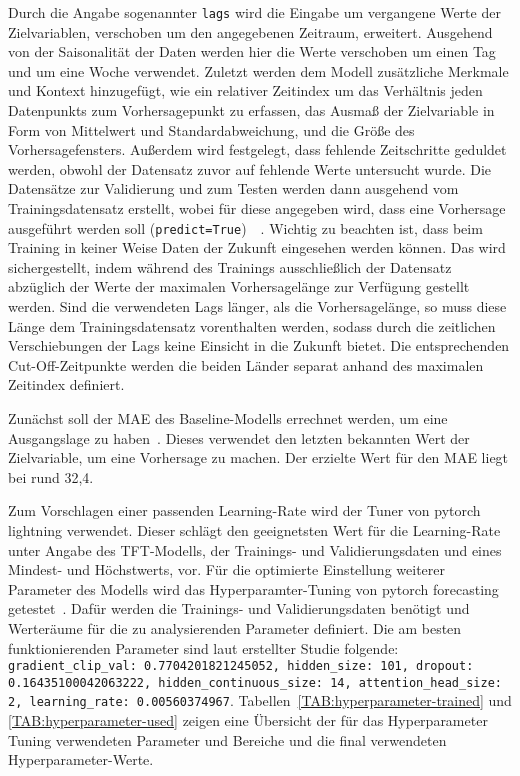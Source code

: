 Durch die Angabe sogenannter \lstinline[columns=fixed]{lags} wird die Eingabe um vergangene Werte der Zielvariablen, verschoben um den angegebenen Zeitraum, erweitert.
Ausgehend von der Saisonalität der Daten werden hier die Werte verschoben um einen Tag und um eine Woche verwendet.
Zuletzt werden dem Modell zusätzliche Merkmale und Kontext hinzugefügt, wie ein relativer Zeitindex um das Verhältnis jeden Datenpunkts zum Vorhersagepunkt zu erfassen, das Ausmaß der Zielvariable in Form von Mittelwert und Standardabweichung, und die Größe des Vorhersagefensters.
Außerdem wird festgelegt, dass fehlende Zeitschritte geduldet werden, obwohl der Datensatz zuvor auf fehlende Werte untersucht wurde.
Die Datensätze zur Validierung und zum Testen werden dann ausgehend vom Trainingsdatensatz erstellt, wobei für diese angegeben wird, dass eine Vorhersage ausgeführt werden soll (\lstinline[columns=fixed]{predict=True})~\cite{Labiadh.2023}~\cite{GitHub.20240307T20:56:16.000Z}.
Wichtig zu beachten ist, dass beim Training in keiner Weise Daten der Zukunft eingesehen werden können.
Das wird sichergestellt, indem während des Trainings ausschließlich der Datensatz abzüglich der Werte der maximalen Vorhersagelänge zur Verfügung gestellt werden.
Sind die verwendeten Lags länger, als die Vorhersagelänge, so muss diese Länge dem Trainingsdatensatz vorenthalten werden, sodass durch die zeitlichen Verschiebungen der Lags keine Einsicht in die Zukunft bietet.
Die entsprechenden Cut-Off-Zeitpunkte werden die beiden Länder separat anhand des maximalen Zeitindex definiert.

Zunächst soll der \ac{MAE} des Baseline-Modells errechnet werden, um eine Ausgangslage zu haben~\cite{PytorchForecastingDocumentation.20230410T20:05:46.000Zb}.
Dieses verwendet den letzten bekannten Wert der Zielvariable, um eine Vorhersage zu machen.
Der erzielte Wert für den \ac{MAE} liegt bei rund 32,4.

Zum Vorschlagen einer passenden Learning-Rate wird der Tuner von pytorch lightning verwendet.
Dieser schlägt den geeignetsten Wert für die Learning-Rate unter Angabe des \ac{TFT}-Modells, der Trainings- und Validierungsdaten und eines Mindest- und Höchstwerts, vor.
Für die optimierte Einstellung weiterer Parameter des Modells wird das Hyperparamter-Tuning von pytorch forecasting getestet~\cite{PytorchForecastingDocumentation.20230410T20:05:46.000Z}.
Dafür werden die Trainings- und Validierungsdaten benötigt und Werteräume für die zu analysierenden Parameter definiert.
Die am besten funktionierenden Parameter sind laut erstellter Studie folgende:
\lstinline[columns=fixed]{gradient_clip_val: 0.7704201821245052, hidden_size: 101, dropout: 0.16435100042063222, hidden_continuous_size: 14, attention_head_size: 2, learning_rate: 0.00560374967}.
Tabellen~\ref{TAB:hyperparameter-trained} und \ref{TAB:hyperparameter-used} zeigen eine Übersicht der für das Hyperparameter Tuning verwendeten Parameter und Bereiche und die final verwendeten Hyperparameter-Werte.

